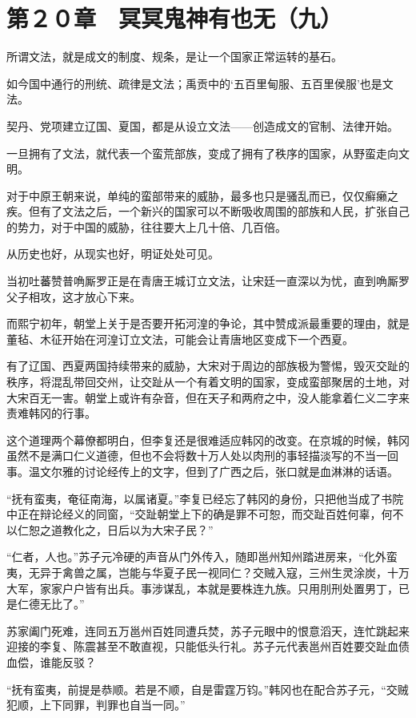 \section{第２０章　冥冥鬼神有也无（九）}

所谓文法，就是成文的制度、规条，是让一个国家正常运转的基石。

如今国中通行的刑统、疏律是文法；禹贡中的‘五百里甸服、五百里侯服’也是文法。

契丹、党项建立辽国、夏国，都是从设立文法——创造成文的官制、法律开始。

一旦拥有了文法，就代表一个蛮荒部族，变成了拥有了秩序的国家，从野蛮走向文明。

对于中原王朝来说，单纯的蛮部带来的威胁，最多也只是骚乱而已，仅仅癣癞之疾。但有了文法之后，一个新兴的国家可以不断吸收周围的部族和人民，扩张自己的势力，对于中国的威胁，往往要大上几十倍、几百倍。

从历史也好，从现实也好，明证处处可见。

当初吐蕃赞普唃厮罗正是在青唐王城订立文法，让宋廷一直深以为忧，直到唃厮罗父子相攻，这才放心下来。

而熙宁初年，朝堂上关于是否要开拓河湟的争论，其中赞成派最重要的理由，就是董毡、木征开始在河湟订立文法，可能会让青唐地区变成下一个西夏。

有了辽国、西夏两国持续带来的威胁，大宋对于周边的部族极为警惕，毁灭交趾的秩序，将混乱带回交州，让交趾从一个有着文明的国家，变成蛮部聚居的土地，对大宋百无一害。朝堂上或许有杂音，但在天子和两府之中，没人能拿着仁义二字来责难韩冈的行事。

这个道理两个幕僚都明白，但李复还是很难适应韩冈的改变。在京城的时候，韩冈虽然不是满口仁义道德，但也不会将数十万人处以肉刑的事轻描淡写的不当一回事。温文尔雅的讨论经传上的文字，但到了广西之后，张口就是血淋淋的话语。

“抚有蛮夷，奄征南海，以属诸夏。”李复已经忘了韩冈的身份，只把他当成了书院中正在辩论经义的同窗，“交趾朝堂上下的确是罪不可恕，而交趾百姓何辜，何不以仁恕之道教化之，日后以为大宋子民？”

“仁者，人也。”苏子元冷硬的声音从门外传入，随即邕州知州踏进房来，“化外蛮夷，无异于禽兽之属，岂能与华夏子民一视同仁？交贼入寇，三州生灵涂炭，十万大军，家家户户皆有出兵。事涉谋乱，本就是要株连九族。只用刖刑处置男丁，已是仁德无比了。”

苏家阖门死难，连同五万邕州百姓同遭兵焚，苏子元眼中的恨意滔天，连忙跳起来迎接的李复、陈震甚至不敢直视，只能低头行礼。苏子元代表邕州百姓要交趾血债血偿，谁能反驳？

“抚有蛮夷，前提是恭顺。若是不顺，自是雷霆万钧。”韩冈也在配合苏子元，“交贼犯顺，上下同罪，判罪也自当一同。”

